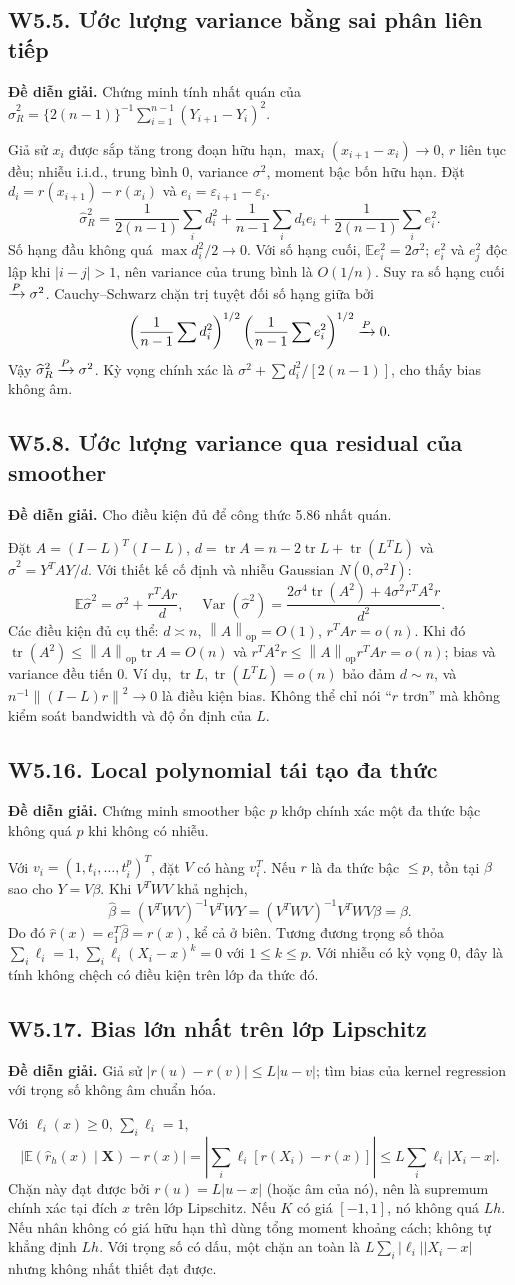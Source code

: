 \documentclass[11pt,a4paper]{article}
\newcommand{\E}{\mathbb E}\newcommand{\Pp}{\mathbb P}
\DeclareMathOperator{\Var}{Var}\DeclareMathOperator{\Cov}{Cov}
\DeclareMathOperator{\tr}{tr}\DeclareMathOperator{\se}{se}
\newcommand{\rh}{\widehat r_h}\newcommand{\ph}{\widehat p}
\newcommand{\norm}[1]{\left\lVert#1\right\rVert}
\newcommand{\supp}[3]{\subsection{#1. #2}\label{s:#1}\textbf{Đề diễn giải.} #3\par}
\begin{document}
\supp{W5.5}{Ước lượng variance bằng sai phân liên tiếp}{Chứng minh tính nhất quán của $\widehat\sigma_R^2=\{2(n-1)\}^{-1}\sum_{i=1}^{n-1}(Y_{i+1}-Y_i)^2$.}
Giả sử $x_i$ được sắp tăng trong đoạn hữu hạn, $\max_i(x_{i+1}-x_i)\to0$, $r$ liên tục đều; nhiễu i.i.d., trung bình 0, variance $\sigma^2$, moment bậc bốn hữu hạn. Đặt $d_i=r(x_{i+1})-r(x_i)$ và $e_i=\varepsilon_{i+1}-\varepsilon_i$.
\[
\widehat\sigma_R^2=\frac1{2(n-1)}\sum_i d_i^2+
\frac1{n-1}\sum_id_ie_i+\frac1{2(n-1)}\sum_ie_i^2.
\]
Số hạng đầu không quá $\max d_i^2/2\to0$. Với số hạng cuối, $\E e_i^2=2\sigma^2$; $e_i^2$ và $e_j^2$ độc lập khi $|i-j|>1$, nên variance của trung bình là $O(1/n)$. Suy ra số hạng cuối $\xrightarrow{P}\sigma^2$. Cauchy--Schwarz chặn trị tuyệt đối số hạng giữa bởi
\[
\left(\frac1{n-1}\sum d_i^2\right)^{1/2}
\left(\frac1{n-1}\sum e_i^2\right)^{1/2}\xrightarrow{P}0.
\]
Vậy $\widehat\sigma_R^2\xrightarrow{P}\sigma^2$. Kỳ vọng chính xác là
$\sigma^2+\sum d_i^2/[2(n-1)]$, cho thấy bias không âm.

\supp{W5.8}{Ước lượng variance qua residual của smoother}{Cho điều kiện đủ để công thức 5.86 nhất quán.}
Đặt $A=(I-L)^T(I-L)$, $d=\tr A=n-2\tr L+\tr(L^TL)$ và
$\widehat\sigma^2=Y^TAY/d$. Với thiết kế cố định và nhiễu Gaussian $N(0,\sigma^2I)$:
\[
\E\widehat\sigma^2=\sigma^2+\frac{r^TAr}{d},\quad
\Var(\widehat\sigma^2)=\frac{2\sigma^4\tr(A^2)+4\sigma^2r^TA^2r}{d^2}.
\]
Các điều kiện đủ cụ thể:
$d\asymp n$, $\norm A_{\mathrm{op}}=O(1)$, $r^TAr=o(n)$.
Khi đó $\tr(A^2)\le\norm A_{\mathrm{op}}\tr A=O(n)$ và
$r^TA^2r\le\norm A_{\mathrm{op}}r^TAr=o(n)$; bias và variance đều tiến 0. Ví dụ, $\tr L,\tr(L^TL)=o(n)$ bảo đảm $d\sim n$, và $n^{-1}\norm{(I-L)r}^2\to0$ là điều kiện bias. Không thể chỉ nói ``$r$ trơn'' mà không kiểm soát bandwidth và độ ổn định của $L$.

\supp{W5.16}{Local polynomial tái tạo đa thức}{Chứng minh smoother bậc $p$ khớp chính xác một đa thức bậc không quá $p$ khi không có nhiễu.}
Với $v_i=(1,t_i,\ldots,t_i^p)^T$, đặt $V$ có hàng $v_i^T$. Nếu $r$ là đa thức bậc $\le p$, tồn tại $\beta$ sao cho $Y=V\beta$. Khi $V^TWV$ khả nghịch,
\[
\widehat\beta=(V^TWV)^{-1}V^TWY=(V^TWV)^{-1}V^TWV\beta=\beta.
\]
Do đó $\widehat r(x)=e_1^T\widehat\beta=r(x)$, kể cả ở biên. Tương đương trọng số thỏa
$\sum_i\ell_i=1$, $\sum_i\ell_i(X_i-x)^k=0$ với $1\le k\le p$.
Với nhiễu có kỳ vọng 0, đây là tính không chệch có điều kiện trên lớp đa thức đó.

\supp{W5.17}{Bias lớn nhất trên lớp Lipschitz}{Giả sử $|r(u)-r(v)|\le L|u-v|$; tìm bias của kernel regression với trọng số không âm chuẩn hóa.}
Với $\ell_i(x)\ge0$, $\sum_i\ell_i=1$,
\[
|\E(\rh(x)\mid\mathbf X)-r(x)|
=\left|\sum_i\ell_i[r(X_i)-r(x)]\right|
\le L\sum_i\ell_i|X_i-x|.
\]
Chặn này đạt được bởi $r(u)=L|u-x|$ (hoặc âm của nó), nên là supremum chính xác tại đích $x$ trên lớp Lipschitz. Nếu $K$ có giá $[-1,1]$, nó không quá $Lh$. Nếu nhân không có giá hữu hạn thì dùng tổng moment khoảng cách; không tự khẳng định $Lh$. Với trọng số có dấu, một chặn an toàn là $L\sum_i|\ell_i||X_i-x|$ nhưng không nhất thiết đạt được.
\end{document}
